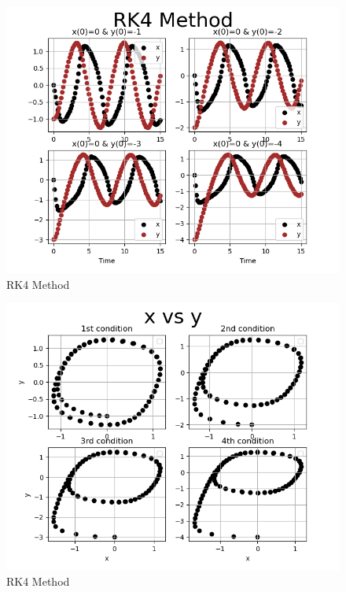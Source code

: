 \documentclass{article}
\begin{document}
\newpage
\begin{figure}[h]
    \centering
    \includegraphics[width=14cm,height=12cm \textwidth]{rk4/Figure_1.png}
\caption{RK4 Method}
\end{figure}
\begin{figure}[h]
    \centering
    \includegraphics[width=14cm,height=12cm \textwidth]{rk4/Figure_2.png}
\caption{RK4 Method}
\end{figure}
\end{document}
